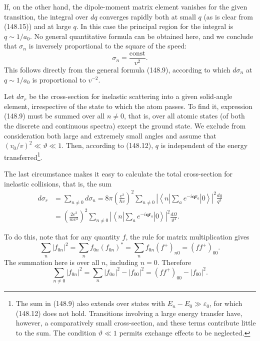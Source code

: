 If, on the other hand, the dipole-moment matrix element vanishes for the given
transition, the integral over $dq$ converges rapidly both at small $q$ (as is
clear from (148.15)) and at large $q$. In this case the principal region for
the integral is $q\sim1/a_0$. No general quantitative formula can be obtained
here, and we conclude that $\sigma_n$ is inversely proportional to the square
of the speed:
\begin{equation}
 \sigma_n=\frac{\mathrm{const}}{v^2}.
 \tag{148.19}
\end{equation}
This follows directly from the general formula (148.9), according to which
$d\sigma_n$ at $q\sim1/a_0$ is proportional to $v^{-2}$.

Let $d\sigma_r$ be the cross-section for inelastic scattering into a given
solid-angle element, irrespective of the state to which the atom passes. To
find it, expression (148.9) must be summed over all $n\ne0$, that is, over all
atomic states (of both the discrete and continuous spectra) except the ground
state. We exclude from consideration both large and extremely small angles
and assume that $(v_0/v)^2\ll\vartheta\ll1$. Then, according to (148.12), $q$
is independent of the energy transferred\footnote{The sum in (148.9) also
extends over states with $E_n-E_0\gg\varepsilon_0$, for which (148.12) does not
hold. Transitions involving a large energy transfer have, however, a
comparatively small cross-section, and these terms contribute little to the
sum. The condition $\vartheta\ll1$ permits exchange effects to be neglected.}.

The last circumstance makes it easy to calculate the total cross-section for
inelastic collisions, that is, the sum
\begin{equation}
\begin{split}
 d\sigma_r&=\sum_{n\ne0}d\sigma_n
 =8\pi\left(\frac{e^2}{\hbar v}\right)^2\sum_{n\ne0}
 \left|\left\langle n\left|\sum_a e^{-i\mathbf q\mathbf r_a}\right|0\right\rangle\right|^2\frac{dq}{q^3}\\
 &=\left(\frac{2e^2}{mv^2}\right)^2\sum_{n\ne0}
 \left|\left\langle n\left|\sum_a e^{-i\mathbf q\mathbf r_a}\right|0\right\rangle\right|^2\frac{d\Omega}{\vartheta^4}.
\end{split}
 \tag{148.20}
\end{equation}

To do this, note that for any quantity $f$, the rule for matrix multiplication
gives
\[
 \sum_n|f_{0n}|^2=\sum_nf_{0n}(f_{0n})^*=\sum_nf_{0n}(f^+)_{n0}=(ff^+)_{00}.
\]
The summation here is over all $n$, including $n=0$. Therefore
\begin{equation}
 \sum_{n\ne0}|f_{0n}|^2=\sum_n|f_{0n}|^2-|f_{00}|^2=(ff^+)_{00}-|f_{00}|^2.
 \tag{148.21}
\end{equation}

